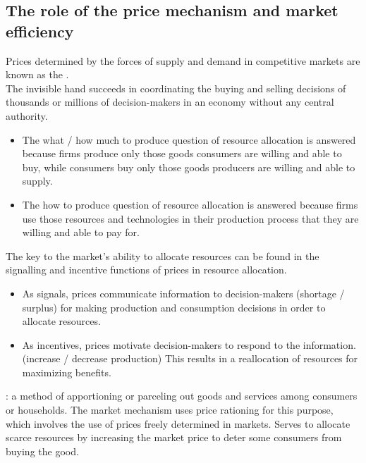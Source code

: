 \subsection{The role of the price mechanism and market efficiency}
Prices determined by the forces of supply and demand in competitive markets are known as the .\\
The invisible hand succeeds in coordinating the buying and selling decisions of thousands or millions of decision-makers in an economy without any central authority. 
\begin{itemize}
  \item The what / how much to produce question of resource allocation is answered because firms produce only those goods consumers are willing and able to buy, while consumers buy only those goods producers are willing and able to supply.
  \item The how to produce question of resource allocation is answered because firms use those resources and technologies in their production process that they are willing and able to pay for.
\end{itemize}
The key to the market's ability to allocate resources can be found in the signalling and incentive functions of prices in resource allocation. 
\begin{itemize}
  \item As signals, prices communicate information to decision-makers (shortage / surplus) for making production and consumption decisions in order to allocate resources.
  \item As incentives, prices motivate decision-makers to respond to the information. (increase / decrease production) This results in a reallocation of resources for maximizing benefits.
\end{itemize}
: a method of apportioning or parceling out goods and services among consumers or households. The market mechanism uses price rationing for this purpose, which involves the use of prices freely determined in markets. Serves to allocate scarce resources by increasing the market price to deter some consumers from buying the good.
